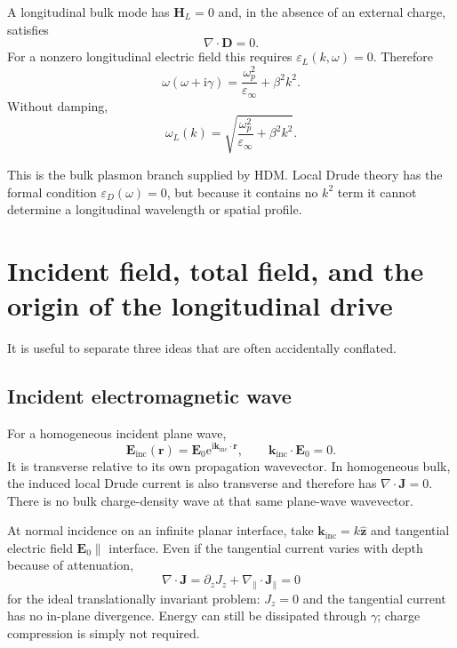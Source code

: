 \documentclass[11pt,a4paper]{article}
\newcommand{\E}{\mathbf E}
\newcommand{\Hfield}{\mathbf H}
\newcommand{\Dfield}{\mathbf D}
\newcommand{\J}{\mathbf J}
\newcommand{\ee}{\mathrm e}
\newcommand{\ii}{\mathrm i}
\newcommand{\eps}{\varepsilon}
\newcommand{\epsinf}{\varepsilon_\infty}
\newcommand{\epsl}{\varepsilon_L}
\newcommand{\omegap}{\omega_p}
\begin{document}
A longitudinal bulk mode has \(\Hfield_L=0\) and, in the absence of an
external charge, satisfies
\begin{equation}
    \nabla\!\cdot\!\Dfield=0.
    \label{eq:longitudinal-gauss}
\end{equation}
For a nonzero longitudinal electric field this requires
\(\epsl(k,\omega)=0\).  Therefore
\begin{equation}
    \boxed{
    \omega(\omega+\ii\gamma)
    =\frac{\omegap^2}{\epsinf}+\beta^2k^2.
    }
    \label{eq:bulk-hdm-dispersion}
\end{equation}
Without damping,
\begin{equation}
    \omega_L(k)=
    \sqrt{\frac{\omegap^2}{\epsinf}+\beta^2k^2}.
    \label{eq:bulk-hdm-dispersion-lossless}
\end{equation}

This is the bulk plasmon branch supplied by HDM.  Local Drude theory has the
formal condition \(\eps_D(\omega)=0\), but because it contains no \(k^2\) term
it cannot determine a longitudinal wavelength or spatial profile.

\section{Incident field, total field, and the origin of the longitudinal drive}

It is useful to separate three ideas that are often accidentally conflated.

\subsection{Incident electromagnetic wave}

For a homogeneous incident plane wave,
\begin{equation}
    \E_{\mathrm{inc}}(\mathbf r)
    =\E_0\ee^{\ii\mathbf k_{\mathrm{inc}}\cdot\mathbf r},
    \qquad
    \mathbf k_{\mathrm{inc}}\!\cdot\!\E_0=0.
    \label{eq:incident-plane-wave}
\end{equation}
It is transverse relative to its own propagation wavevector.  In homogeneous
bulk, the induced local Drude current is also transverse and therefore has
\(\nabla\!\cdot\!\J=0\).  There is no bulk charge-density wave at that same
plane-wave wavevector.

At normal incidence on an infinite planar interface, take
\(\mathbf k_{\mathrm{inc}}=k\hat{\mathbf z}\) and tangential electric field
\(\E_0\parallel\) interface.  Even if the tangential current varies with
depth because of attenuation,
\begin{equation}
    \nabla\!\cdot\!\J
    =\partial_zJ_z+\nabla_\parallel\!\cdot\!\J_\parallel=0
    \label{eq:normal-incidence-no-charge}
\end{equation}
for the ideal translationally invariant problem: \(J_z=0\) and the tangential
current has no in-plane divergence.  Energy can still be dissipated through
\(\gamma\); charge compression is simply not required.
\end{document}
